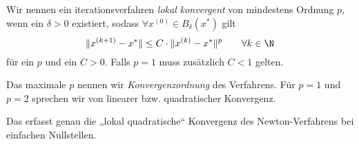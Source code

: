 \documentclass[11pt]{scrbook}
\begin{document}
\begin{df}[Konvergenzordnung] \label{3.11}
	Wir nennen ein iterationsverfahren \emph{lokal konvergent} von mindestens Ordnung $p$, wenn ein $\delta > 0$ existiert, sodass $\forall x^{(0)} \in B_\delta(x^*)$ gilt
	\[
		\|x^{(k+1)} - x^*\| \le C \cdot \|x^{(k)} - x^*\|^p
		\qquad \forall k\in \N
	\]
	für ein $p$ und ein $C > 0$.
	Falls $p=1$ muss zusätzlich $C < 1$ gelten.

	Das maximale $p$ nennen wir \emph{Konvergenzordnung} des Verfahrens.
	Für $p=1$ und $p=2$ sprechen wir von linearer bzw. quadratischer Konvergenz.
	\begin{note}
		Das erfasst genau die „lokal quadratische“ Konvergenz des Newton-Verfahrens bei einfachen Nullstellen.
	\end{note}
\end{df}
\end{document}
